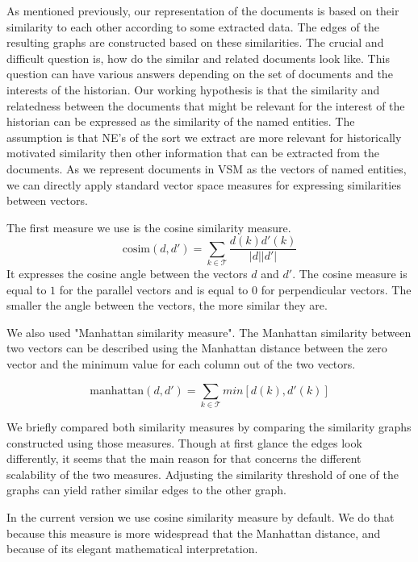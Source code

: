 
As mentioned previously, our representation of the documents is based on their similarity to each other according to some extracted data. The edges of the resulting graphs are constructed based on these similarities. The crucial and difficult question is, how do the similar and related documents look like. This question can have various answers depending on the set of documents and the interests of the historian. Our working hypothesis is that the similarity and relatedness between the documents that might be relevant for the interest of the historian can be expressed as the similarity of the named entities. 
The assumption is that NE's of the sort we extract are more relevant for historically motivated similarity then other information that can be extracted from the documents. As we represent documents in VSM as the vectors of named entities, we can directly apply standard vector space measures for expressing similarities between vectors. 

The first measure we use is the cosine similarity measure. 
\[\text{cosim}(d,d') = \sum_{k \in \mathcal{T}}\frac{d(k)d'(k)}{|d||d'|}\]
It expresses the cosine angle between the vectors $d$ and $d'$. The cosine measure is equal to $1$ for the parallel vectors and is equal to $0$ for perpendicular vectors. The smaller the angle between the vectors, the more similar they are.

We also used "Manhattan similarity measure". The Manhattan similarity between two vectors can be described using the Manhattan distance between the zero vector and the minimum value for each column out of the two vectors.

\[\text{manhattan}(d,d') = \sum_{k \in \mathcal{T}}min[d(k), d'(k)]\]

We briefly compared both similarity measures by comparing the similarity graphs constructed using those measures. Though at first glance the edges look differently, it seems that the main reason for that concerns the different scalability of the two measures. Adjusting the similarity threshold of one of the graphs can yield rather similar edges to the other graph.

In the current version we use cosine similarity measure by default. We do that because this measure is more widespread that the Manhattan distance, and because of its elegant mathematical interpretation.

